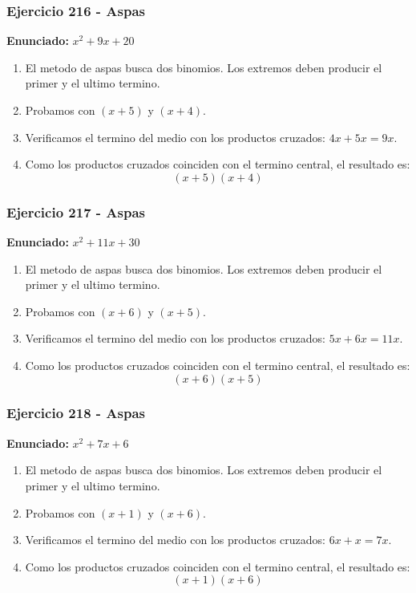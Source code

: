 \documentclass[11pt,a4paper]{article}
\begin{document}
\vspace{0.2cm}
\subsubsection*{Ejercicio 216 - Aspas}
\textbf{Enunciado:} $ x^{2} + 9 x + 20 $\par
\begin{enumerate}[leftmargin=2em]
\item El metodo de aspas busca dos binomios. Los extremos deben producir el primer y el ultimo termino.
\item Probamos con \((x + 5)\) y \((x + 4)\).
\item Verificamos el termino del medio con los productos cruzados: \(4 x+5 x=9 x\).
\item Como los productos cruzados coinciden con el termino central, el resultado es: \[\boxed{\left(x + 5\right)\left(x + 4\right)}\]
\end{enumerate}

\vspace{0.2cm}
\subsubsection*{Ejercicio 217 - Aspas}
\textbf{Enunciado:} $ x^{2} + 11 x + 30 $\par
\begin{enumerate}[leftmargin=2em]
\item El metodo de aspas busca dos binomios. Los extremos deben producir el primer y el ultimo termino.
\item Probamos con \((x + 6)\) y \((x + 5)\).
\item Verificamos el termino del medio con los productos cruzados: \(5 x+6 x=11 x\).
\item Como los productos cruzados coinciden con el termino central, el resultado es: \[\boxed{\left(x + 6\right)\left(x + 5\right)}\]
\end{enumerate}

\vspace{0.2cm}
\subsubsection*{Ejercicio 218 - Aspas}
\textbf{Enunciado:} $ x^{2} + 7 x + 6 $\par
\begin{enumerate}[leftmargin=2em]
\item El metodo de aspas busca dos binomios. Los extremos deben producir el primer y el ultimo termino.
\item Probamos con \((x + 1)\) y \((x + 6)\).
\item Verificamos el termino del medio con los productos cruzados: \(6 x+x=7 x\).
\item Como los productos cruzados coinciden con el termino central, el resultado es: \[\boxed{\left(x + 1\right)\left(x + 6\right)}\]
\end{enumerate}
\end{document}
